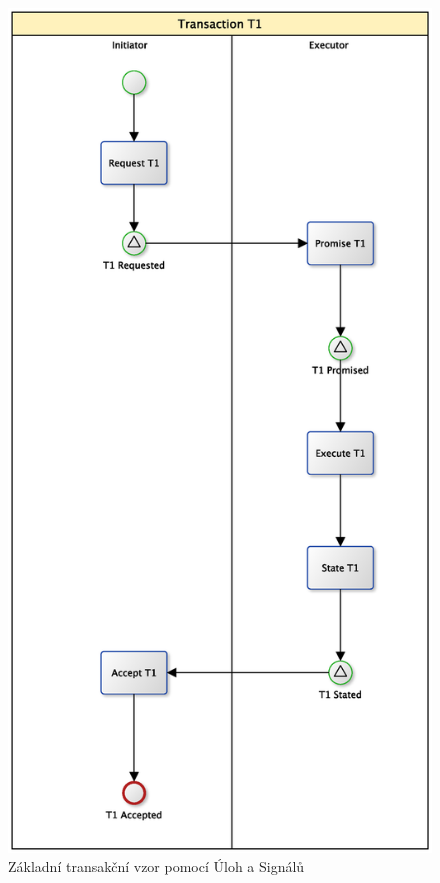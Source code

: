 \documentclass[]{article}
\begin{document}
\begin{figure}[H]\centering
\includegraphics[width=\textwidth,height=\textheight,keepaspectratio]{obrazky/transaction-basic-signals}
\caption{Základní transakční vzor pomocí Úloh a Signálů}
\label{fig:Zk_trans_ulohy_signaly}
\end{figure}
\end{document}
